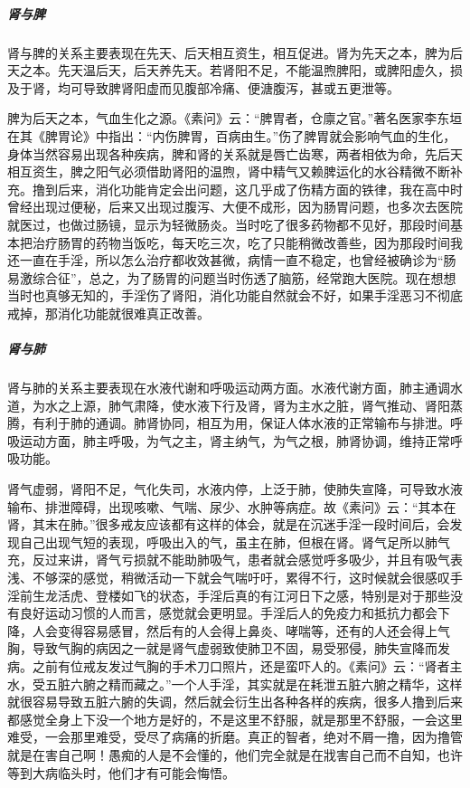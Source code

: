 \subparagraph{肾与脾}

肾与脾的关系主要表现在先天、后天相互资生，相互促进。肾为先天之本，脾为后天之本。先天温后天，后天养先天。若肾阳不足，不能温煦脾阳，或脾阳虚久，损及于肾，均可导致脾肾阳虚而见腹部冷痛、便溏腹泻，甚或五更泄等。

脾为后天之本，气血生化之源。《素问》云：“脾胃者，仓廪之官。”著名医家李东垣在其《脾胃论》中指出：“内伤脾胃，百病由生。”伤了脾胃就会影响气血的生化，身体当然容易出现各种疾病，脾和肾的关系就是唇亡齿寒，两者相依为命，先后天相互资生，脾之阳气必须借助肾阳的温煦，肾中精气又赖脾运化的水谷精微不断补充。撸到后来，消化功能肯定会出问题，这几乎成了伤精方面的铁律，我在高中时曾经出现过便秘，后来又出现过腹泻、大便不成形，因为肠胃问题，也多次去医院就医过，也做过肠镜，显示为轻微肠炎。当时吃了很多药物都不见好，那段时间基本把治疗肠胃的药物当饭吃，每天吃三次，吃了只能稍微改善些，因为那段时间我还一直在手淫，所以怎么治疗都收效甚微，病情一直不稳定，也曾经被确诊为“肠易激综合征”，总之，为了肠胃的问题当时伤透了脑筋，经常跑大医院。现在想想当时也真够无知的，手淫伤了肾阳，消化功能自然就会不好，如果手淫恶习不彻底戒掉，那消化功能就很难真正改善。

\subparagraph{肾与肺}

肾与肺的关系主要表现在水液代谢和呼吸运动两方面。水液代谢方面，肺主通调水道，为水之上源，肺气肃降，使水液下行及肾，肾为主水之脏，肾气推动、肾阳蒸腾，有利于肺的通调。肺肾协同，相互为用，保证人体水液的正常输布与排泄。呼吸运动方面，肺主呼吸，为气之主，肾主纳气，为气之根，肺肾协调，维持正常呼吸功能。

肾气虚弱，肾阳不足，气化失司，水液内停，上泛于肺，使肺失宣降，可导致水液输布、排泄障碍，出现咳嗽、气喘、尿少、水肿等病症。故《素问》云：“其本在肾，其末在肺。”很多戒友应该都有这样的体会，就是在沉迷手淫一段时间后，会发现自己出现气短的表现，呼吸出入的气，虽主在肺，但根在肾。肾气足所以肺气充，反过来讲，肾气亏损就不能助肺吸气，患者就会感觉呼多吸少，并且有吸气表浅、不够深的感觉，稍微活动一下就会气喘吁吁，累得不行，这时候就会很感叹手淫前生龙活虎、登楼如飞的状态，手淫后真的有江河日下之感，特别是对于那些没有良好运动习惯的人而言，感觉就会更明显。手淫后人的免疫力和抵抗力都会下降，人会变得容易感冒，然后有的人会得上鼻炎、哮喘等，还有的人还会得上气胸，导致气胸的病因之一就是肾气虚弱致使肺卫不固，易受邪侵，肺失宣降而发病。之前有位戒友发过气胸的手术刀口照片，还是蛮吓人的。《素问》云：“肾者主水，受五脏六腑之精而藏之。”一个人手淫，其实就是在耗泄五脏六腑之精华，这样就很容易导致五脏六腑的失调，然后就会衍生出各种各样的疾病，很多人撸到后来都感觉全身上下没一个地方是好的，不是这里不舒服，就是那里不舒服，一会这里难受，一会那里难受，受尽了病痛的折磨。真正的智者，绝对不屑一撸，因为撸管就是在害自己啊！愚痴的人是不会懂的，他们完全就是在戕害自己而不自知，也许等到大病临头时，他们才有可能会悔悟。

